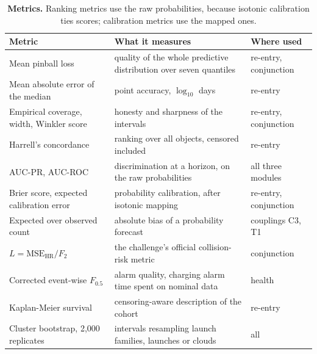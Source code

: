 \documentclass[3p,times,twocolumn]{elsarticle}
\begin{document}
\begin{table}[t]
\centering
\footnotesize
\caption{\textbf{Metrics.} Ranking metrics use the raw probabilities,
because isotonic calibration ties scores; calibration metrics use the
mapped ones.}\label{tbl:metrics}
\begin{tabular}{@{}
>{\raggedright\arraybackslash}p{}
  >{\raggedright\arraybackslash}p{}
  >{\raggedright\arraybackslash}p{}@{}}
\toprule\noalign{}
\begin{minipage}[b]{\linewidth}\raggedright
Metric
\end{minipage} & \begin{minipage}[b]{\linewidth}\raggedright
What it measures
\end{minipage} & \begin{minipage}[b]{\linewidth}\raggedright
Where used
\end{minipage} \\
\midrule\noalign{}

\bottomrule\noalign{}

Mean pinball loss & quality of the whole predictive distribution over
seven quantiles & re-entry, conjunction \\
Mean absolute error of the median & point accuracy, \(\log_{10}\) days &
re-entry \\
Empirical coverage, width, Winkler score & honesty and sharpness of the
intervals & re-entry, conjunction \\
Harrell's concordance & ranking over all objects, censored included &
re-entry \\
AUC-PR, AUC-ROC & discrimination at a horizon, on the raw probabilities
& all three modules \\
Brier score, expected calibration error & probability calibration, after
isotonic mapping & re-entry, conjunction \\
Expected over observed count & absolute bias of a probability forecast &
couplings C3, T1 \\
\(L=\mathrm{MSE}_{\mathrm{HR}}/F_2\) & the challenge's official
collision-risk metric & conjunction \\
Corrected event-wise \(F_{0.5}\) & alarm quality, charging alarm time
spent on nominal data & health \\
Kaplan-Meier survival & censoring-aware description of the cohort &
re-entry \\
Cluster bootstrap, 2,000 replicates & intervals resampling launch
families, launches or clouds & all \\
\end{tabular}
\end{table}
\end{document}
